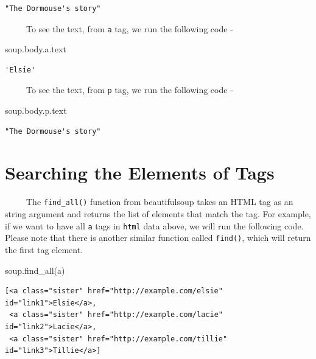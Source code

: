 \documentclass[
  letterpaper,
  DIV=11,
  numbers=noendperiod]{scrreprt}
\newenvironment{Shaded}{\begin{snugshade}}{\end{snugshade}}
\newcommand{\NormalTok}[1]{\textcolor[rgb]{0.00,0.23,0.31}{#1}}
\newcommand{\StringTok}[1]{\textcolor[rgb]{0.13,0.47,0.30}{#1}}
\begin{document}
\begin{verbatim}
"The Dormouse's story"
\end{verbatim}

~~~~~To see the text, from \texttt{a} tag, we run the following code -

\begin{Shaded}
\begin{Highlighting}[]
\NormalTok{soup.body.a.text}
\end{Highlighting}
\end{Shaded}

\begin{verbatim}
'Elsie'
\end{verbatim}

~~~~~To see the text, from \texttt{p} tag, we run the following code -

\begin{Shaded}
\begin{Highlighting}[]
\NormalTok{soup.body.p.text}
\end{Highlighting}
\end{Shaded}

\begin{verbatim}
"The Dormouse's story"
\end{verbatim}

\section{Searching the Elements of
Tags}\label{searching-the-elements-of-tags}

~~~~~The \texttt{find\_all()} function from beautifulsoup takes an HTML
tag as an string argument and returns the list of elements that match
the tag. For example, if we want to have all \texttt{a} tags in
\texttt{html} data above, we will run the following code. Please note
that there is another similar function called \texttt{find()}, which
will return the first tag element.

\begin{Shaded}
\begin{Highlighting}[]
\NormalTok{soup.find\_all(}\StringTok{\textquotesingle{}a\textquotesingle{}}\NormalTok{)}
\end{Highlighting}
\end{Shaded}

\begin{verbatim}
[<a class="sister" href="http://example.com/elsie" id="link1">Elsie</a>,
 <a class="sister" href="http://example.com/lacie" id="link2">Lacie</a>,
 <a class="sister" href="http://example.com/tillie" id="link3">Tillie</a>]
\end{verbatim}
\end{document}
